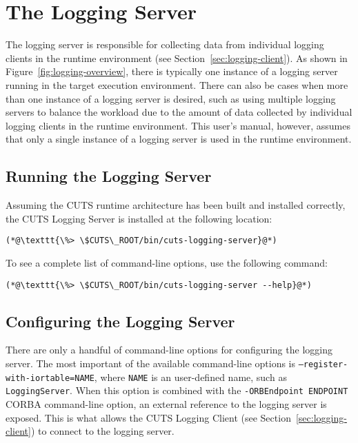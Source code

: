 \section{The Logging Server}
\label{sec:logging-server}

The logging server is responsible for collecting data from individual 
logging clients in the runtime environment (see Section~\ref{sec:logging-client}).
As shown in Figure~\ref{fig:logging-overview}, there is typically 
one instance of a logging server running in the target execution 
environment. There can also be cases when more than one instance of a 
logging server is desired, such as using multiple logging servers to 
balance the workload due to the amount of data collected by individual
logging clients in the runtime environment. This user's manual, however, 
assumes that only a single instance of a logging server is used in the 
runtime environment.

\subsection{Running the Logging Server}

Assuming the CUTS runtime architecture has been built and installed 
correctly, the CUTS Logging Server is installed at the following 
location:
\begin{lstlisting}
(*@\texttt{\%> \$CUTS\_ROOT/bin/cuts-logging-server}@*)
\end{lstlisting}
To see a complete list of command-line options, use the following 
command:
\begin{lstlisting}
(*@\texttt{\%> \$CUTS\_ROOT/bin/cuts-logging-server --help}@*)
\end{lstlisting}

\subsection{Configuring the Logging Server}

There are only a handful of command-line options for configuring the
logging server. The most important of the available command-line options
is \texttt{--register-with-iortable=NAME}, where \texttt{NAME} 
is an user-defined name, such as \texttt{LoggingServer}. When this 
option is combined with the \texttt{-ORBEndpoint ENDPOINT} CORBA 
command-line option, an external reference to the logging server is 
exposed. This is what allows the CUTS Logging Client (see 
Section~\ref{sec:logging-client}) to connect to the logging server.

